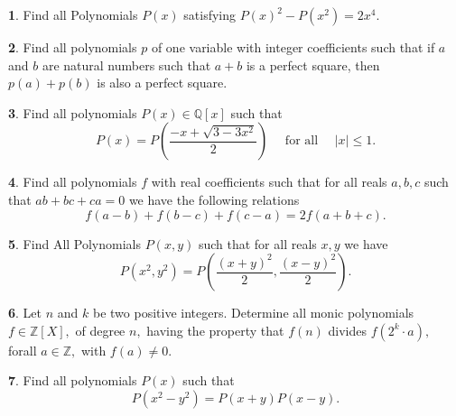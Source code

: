 \documentclass{article}
\theoremstyle{definition}
\newtheorem{p}{}
\begin{document}
\begin{p}
Find all Polynomials $ P(x)$ satisfying $ P(x)^2-P(x^2) =2x^4$.
\end{p}





\begin{p}
Find all polynomials $ p$ of one variable with integer coefficients such that if $ a$ and $ b$ are natural numbers such that $ a +b$ is a perfect square, then $ p\left(a\right)+ p\left(b\right)$ is also a perfect square.
\end{p}





\begin{p}
Find all polynomials $P(x)\in \mathbb Q[x]$ such that
\[P(x)=P\left(\frac{-x+\sqrt{3 -3x^2}}{2}\right) \quad \text{ for all } \quad |x| \le 1.\]
\end{p}





\begin{p}
Find all polynomials $f$ with real coefficients such that for all reals $a,b,c$ such that $ab+bc+ca = 0$ we have the following relations
\[ f(a-b) + f(b-c) + f(c-a) = 2f(a+b+c). \]
\end{p}





\begin{p}
Find All Polynomials $ P(x,y)$ such that for all reals $ x,y$ we have
\[P(x^{2},y^{2}) =P\left(\frac {(x + y)^{2}}{2},\frac {(x - y)^{2}}{2}\right).\]
\end{p}





\begin{p}
Let $ n$ and $ k$ be two positive integers. Determine all monic polynomials $ f\in\mathbb{Z}[X],$ of degree $ n,$ having the property that $ f(n)$ divides $ f\left (2^{k}\cdot a\right ),$ forall $ a\in\mathbb{Z},$ with $ f(a)\neq 0.$
\end{p}





\begin{p}
Find all polynomials $ P(x)$ such that
\[P(x^2-y^2)=P(x+y)P(x-y).\]
\end{p}
\end{document}
